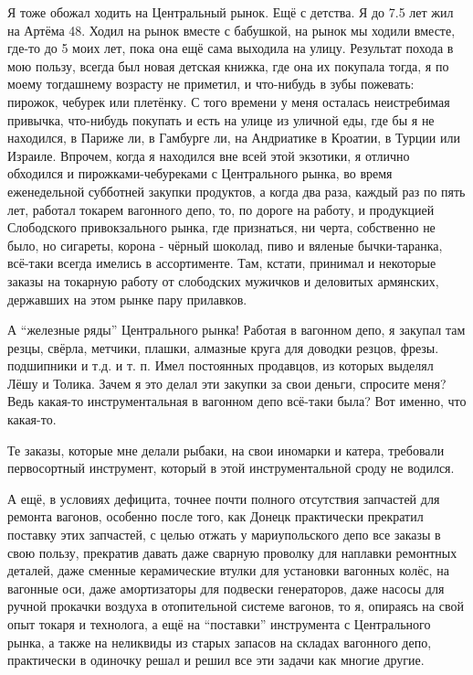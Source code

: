 Я тоже обожал ходить на Центральный рынок. Ещё с детства. Я до 7.5 лет жил на
Артёма 48. Ходил на рынок вместе с бабушкой, на рынок мы ходили вместе, где-то
до 5 моих лет, пока она ещё сама выходила на улицу. Результат похода в мою
пользу, всегда был новая детская книжка, где она их покупала тогда, я по моему
тогдашнему возрасту не приметил, и что-нибудь в зубы пожевать: пирожок, чебурек
или плетёнку. С того времени у меня осталась неистребимая привычка, что-нибудь
покупать и есть на улице из уличной еды, где бы я не находился, в Париже ли, в
Гамбурге ли, на Андриатике в Кроатии, в Турции или Израиле. Впрочем, когда я
находился вне всей этой экзотики, я отлично обходился и пирожками-чебуреками с
Центрального рынка, во время еженедельной субботней закупки продуктов, а когда
два раза, каждый раз по пять лет, работал токарем вагонного депо, то, по дороге
на работу, и продукцией Слободского привокзального рынка, где признаться, ни
черта, собственно не было, но сигареты, корона - чёрный шоколад, пиво и вяленые
бычки-таранка, всё-таки всегда имелись в ассортименте. Там, кстати, принимал и
некоторые заказы на токарную работу от слободских мужичков и деловитых
армянских, державших на этом рынке пару прилавков.

А \enquote{железные ряды} Центрального рынка! Работая в вагонном депо, я закупал там
резцы, свёрла, метчики, плашки, алмазные круга для доводки резцов, фрезы.
подшипники и т.д. и т. п. Имел постоянных продавцов, из которых выделял Лёшу и
Толика. Зачем я это делал эти закупки за свои деньги, спросите меня? Ведь
какая-то инструментальная в вагонном депо всё-таки была? Вот именно, что
какая-то. 

Те заказы, которые мне делали рыбаки, на свои иномарки и катера, требовали
первосортный инструмент, который в этой инструментальной сроду не водился.

А ещё, в условиях дефицита, точнее почти полного отсутствия запчастей для
ремонта вагонов, особенно после того, как Донецк практически прекратил поставку
этих запчастей, с целью отжать у мариупольского депо все заказы в свою пользу,
прекратив давать даже сварную проволку для наплавки ремонтных деталей, даже
сменные керамические втулки для установки вагонных колёс, на вагонные оси, даже
амортизаторы для подвески генераторов, даже насосы для ручной прокачки воздуха
в отопительной системе вагонов, то я, опираясь на свой опыт токаря и технолога,
а ещё на \enquote{поставки} инструмента с Центрального рынка, а также на неликвиды из
старых запасов на складах вагонного депо, практически в одиночку решал и решил
все эти задачи как многие другие.

